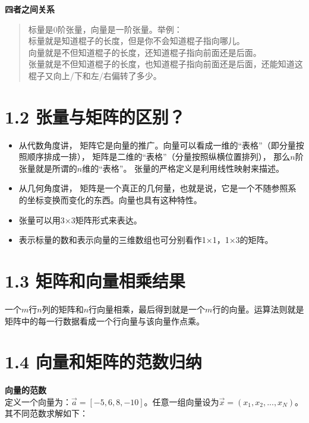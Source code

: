 \documentclass[]{book}
\providecommand{\tightlist}{%
  \setlength{\itemsep}{0pt}\setlength{\parskip}{0pt}}
\begin{document}
\textbf{四者之间关系}

\begin{quote}
标量是0阶张量，向量是一阶张量。举例：\\
​标量就是知道棍子的长度，但是你不会知道棍子指向哪儿。\\
​向量就是不但知道棍子的长度，还知道棍子指向前面还是后面。\\
​张量就是不但知道棍子的长度，也知道棍子指向前面还是后面，还能知道这棍子又向上/下和左/右偏转了多少。
\end{quote}

\section{1.2
张量与矩阵的区别？}\label{ux5f20ux91cfux4e0eux77e9ux9635ux7684ux533aux522b}

\begin{itemize}
\tightlist
\item
  从代数角度讲，
  矩阵它是向量的推广。向量可以看成一维的``表格''（即分量按照顺序排成一排），
  矩阵是二维的``表格''（分量按照纵横位置排列），
  那么\(n\)阶张量就是所谓的\(n\)维的``表格''。
  张量的严格定义是利用线性映射来描述。
\item
  从几何角度讲，
  矩阵是一个真正的几何量，也就是说，它是一个不随参照系的坐标变换而变化的东西。向量也具有这种特性。
\item
  张量可以用3×3矩阵形式来表达。
\item
  表示标量的数和表示向量的三维数组也可分别看作1×1，1×3的矩阵。
\end{itemize}

\section{1.3
矩阵和向量相乘结果}\label{ux77e9ux9635ux548cux5411ux91cfux76f8ux4e58ux7ed3ux679c}

​
一个\(m\)行\(n\)列的矩阵和\(n\)行向量相乘，最后得到就是一个\(m\)行的向量。运算法则就是矩阵中的每一行数据看成一个行向量与该向量作点乘。

\section{1.4
向量和矩阵的范数归纳}\label{ux5411ux91cfux548cux77e9ux9635ux7684ux8303ux6570ux5f52ux7eb3}

\textbf{向量的范数}\\
​
定义一个向量为：\(\vec{a}=[-5, 6, 8, -10]\)。任意一组向量设为\(\vec{x}=(x_1,x_2,...,x_N)\)。其不同范数求解如下：
\end{document}
